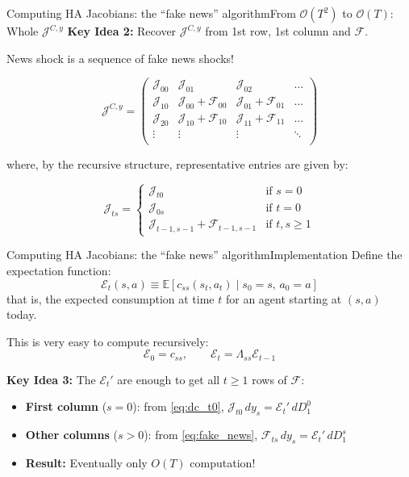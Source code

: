 \documentclass[aspectratio=169]{beamer}
\begin{document}
\begin{frame}{Computing HA Jacobians: the ``fake news'' algorithm}{From $\mathcal{O}(T^2)$ to $\mathcal{O}(T)$: Whole $\mathcal{J}^{C,y}$}
    \textbf{Key Idea 2:} Recover $\mathcal{J}^{C,y}$ from 1st row, 1st column and $\mathcal{F}$.

    News shock is a sequence of fake news shocks!

    \[
    \mathcal{J}^{C,y} =
    \begin{pmatrix}
        \mathcal{J}_{00} & \mathcal{J}_{01} & \mathcal{J}_{02} & \dots \\
        \mathcal{J}_{10} & \mathcal{J}_{00} + \mathcal{F}_{00} & \mathcal{J}_{01} + \mathcal{F}_{01} & \dots \\
        \mathcal{J}_{20} & \mathcal{J}_{10} + \mathcal{F}_{10} & \mathcal{J}_{11} + \mathcal{F}_{11} & \dots \\
        \vdots & \vdots & \vdots & \ddots \\
    \end{pmatrix}
    \]

    where, by the recursive structure, representative entries are given by:

    \[
    \mathcal{J}_{ts} =
    \begin{cases}
        \mathcal{J}_{t0} & \text{if } s = 0 \\
        \mathcal{J}_{0s} & \text{if } t = 0 \\
        \mathcal{J}_{t-1,s-1} + \mathcal{F}_{t-1,s-1} & \text{if } t,s \geq 1
    \end{cases}
    \]

\end{frame}


\begin{frame}{Computing HA Jacobians: the ``fake news'' algorithm}{Implementation}
    Define the expectation function:
    \[
        \mathcal{E}_t(s, a) \equiv \mathbb{E} \left[ c_{ss}(s_t, a_t) \mid s_0 = s,\, a_0 = a \right]
    \]
    that is, the expected consumption at time $t$ for an agent starting at $(s,a)$ today.

    \vspace{0.5em}

    This is very easy to compute recursively:
    \[
        \mathcal{E}_0 = c_{ss}, \qquad
        \mathcal{E}_t = \Lambda_{ss} \mathcal{E}_{t-1}
    \]

    \vspace{0.5em}

    \textbf{Key Idea 3:} The $\mathcal{E}_t'$ are enough to get all $t \geq 1$ rows of $\mathcal{F}$:

    \begin{itemize}
        \item \textbf{First column} ($s = 0$): from \eqref{eq:dc_t0},\; $\mathcal{J}_{t0}\, dy_s = \mathcal{E}_t' \, dD^0_1$
        \item \textbf{Other columns} ($s > 0$): from \eqref{eq:fake_news},\; $\mathcal{F}_{ts}\, dy_s = \mathcal{E}_t' \, dD^s_1$
        \item \textbf{Result:} Eventually only $O(T)$ computation!
    \end{itemize}
\end{frame}
\end{document}
